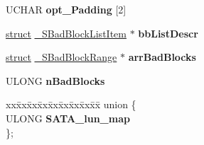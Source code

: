 \begin{DoxyCompactItemize}
\mbox{\label{struct___h_w___l_u___e_x_t_e_n_s_i_o_n_ae68dbc9b5842b83ff0eb81e9980286a9}} 
U\+C\+H\+AR {\bfseries opt\+\_\+\+Padding} \mbox{[}2\mbox{]}
\item 
\mbox{\label{struct___h_w___l_u___e_x_t_e_n_s_i_o_n_a8ca8dacbe38b89c6ad3db09fa42198ca}} 
\hyperlink{interfacestruct}{struct} \hyperlink{struct___s_bad_block_list_item}{\+\_\+\+S\+Bad\+Block\+List\+Item} $\ast$ {\bfseries bb\+List\+Descr}
\item 
\mbox{\label{struct___h_w___l_u___e_x_t_e_n_s_i_o_n_a267d198cb1126c2b69a1864930f2216f}} 
\hyperlink{interfacestruct}{struct} \hyperlink{struct___s_bad_block_range}{\+\_\+\+S\+Bad\+Block\+Range} $\ast$ {\bfseries arr\+Bad\+Blocks}
\item 
\mbox{\label{struct___h_w___l_u___e_x_t_e_n_s_i_o_n_ac2705e277dae4e62a3315d9ef681d4c6}} 
U\+L\+O\+NG {\bfseries n\+Bad\+Blocks}
\item 
\mbox{\label{struct___h_w___l_u___e_x_t_e_n_s_i_o_n_a59f20e4f955258681482960dfad0637c}} 
\begin{tabbing}
xx\=xx\=xx\=xx\=xx\=xx\=xx\=xx\=xx\=\kill
union \{\\
\>ULONG {\bfseries SATA\_lun\_map}\\
\}; \\


\end{tabbing}
\end{DoxyCompactItemize}
